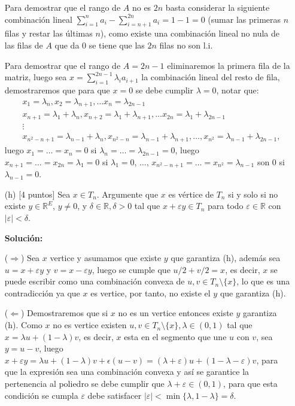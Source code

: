 \documentclass{article}
\newcommand{\RR}{\mathbb R}
\theoremstyle{plain}
\theoremstyle{definition}
\theoremstyle{Azul}
\begin{document}
\begin{enumerate}
Para demostrar que el rango de $A$ no es $2n$ basta considerar la siguiente combinación lineal $\sum_{i=1}^{n}a_{i}-\sum_{i=n+1}^{2n}a_{i} = 1-1=0$ (sumar las primeras $n$ filas y restar las últimas $n$), como existe una combinación lineal no nula de las filas de $A$ que da $0$ se tiene que las $2n$ filas no son l.i.

Para demostrar que el rango de $A=2n-1$ eliminaremos la primera fila de la matriz, luego sea $x=\sum_{i=1}^{2n-1}\lambda_{i}a_{i+1}$ la combinación lineal del resto de fila, demostraremos que para que $x=0$ se debe cumplir $\lambda=0$, notar que:
\begin{align*}
	& x_{1}  = \lambda_{n}, x_{2}=\lambda_{n+1}, \ldots x_{n} = \lambda_{2n-1}\\
	& x_{n+1} = \lambda_{1}+\lambda_{n}, x_{n+2} = \lambda_{1}+\lambda_{n+1}, \ldots x_{2n} = \lambda_{1}+\lambda_{2n-1}\\
	& \vdots\\
	&x_{n^{2}-n+1} =\lambda_{n-1}+\lambda_{n}, x_{n^{2}-n} =\lambda_{n-1}+\lambda_{n+1}, \ldots, x_{n^{2}}=\lambda_{n-1}+\lambda_{2n-1},
\end{align*}
luego $x_{1}=\ldots=x_{n}=0$ si $\lambda_{n}=\ldots=\lambda_{2n-1}=0$, luego $x_{n+1}= \ldots = x_{2n} = \lambda_{1}=0$ si $\lambda_{1}=0$, $\ldots$, $x_{n^{2}-n+1}=\ldots = x_{n^{2}}=\lambda_{n-1}$ son 0 si $\lambda_{n-1}=0$.

\item[(h)] [4 puntos] Sea $x\in T_n$. Argumente que $x$ es vértice de $T_n$ si y solo si no existe $y\in \RR^E$, $y\neq 0$, y $\delta\in \RR, \delta>0$ tal que  $x+\varepsilon y\in T_n$ para todo $\varepsilon\in \RR$ con $|\varepsilon|<\delta$.

\textbf{Solución:}

($\Rightarrow$) Sea $x$ vertice y asumamos que existe $y$ que garantiza (h), además sea $u=x+\varepsilon y$ y $v=x-\varepsilon y$, luego se cumple que $u/2+v/2=x$, es decir, $x$ se puede escribir como una combinación convexa de $u, v \in T_{n}\setminus\{x\}$, lo que es una contradicción ya que $x$ es vertice, por tanto, no existe el $y$ que garantiza (h).

($\Leftarrow$) Demostraremos que si $x$ no es un vertice entonces existe $y$ garantiza (h). Como $x$ no es vertice existen $u,v \in T_{n}\setminus\{x\}, \lambda\in(0,1)$ tal que $x=\lambda u +(1-\lambda) v$, es decir, $x$ esta en el segmento que une $u$ con $v$, sea $y=u-v$, luego $x+\varepsilon y=\lambda u +(1-\lambda) v+\epsilon(u-v)=(\lambda+\varepsilon)u+(1-\lambda-\varepsilon)v$, para que la expresión sea una combinación convexa y así se garantice la pertenencia al poliedro se debe cumplir que $\lambda+\varepsilon\in(0,1)$, para que esta condición se cumpla $\varepsilon$ debe satisfacer $|\varepsilon|<\min\{\lambda, 1-\lambda\}=\delta$.


\end{enumerate}
\end{document}
